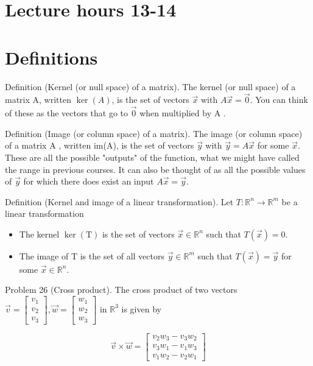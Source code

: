 \documentclass[10pt]{article}
\begin{document}
\section*{Lecture hours 13-14}
\section*{Definitions}
Definition (Kernel (or null space) of a matrix). The kernel (or null space) of a matrix A, written $\operatorname{ker}(A)$, is the set of vectors $\vec{x}$ with $A \vec{x}=\overrightarrow{0}$. You can think of these as the vectors that go to $\overrightarrow{0}$ when multiplied by A .

Definition (Image (or column space) of a matrix). The image (or column space) of a matrix A , written im(A), is the set of vectors $\vec{y}$ with $\vec{y}=A \vec{x}$ for some $\vec{x}$. These are all the possible "outputs" of the function, what we might have called the range in previous courses. It can also be thought of as all the possible values of $\vec{y}$ for which there does exist an input $A \vec{x}=\vec{y}$.

Definition (Kernel and image of a linear transformation). Let $T: \mathbb{R}^{n} \rightarrow \mathbb{R}^{m}$ be a linear transformation

\begin{itemize}
  \item The kernel $\operatorname{ker}(\mathrm{T})$ is the set of vectors $\vec{x} \in \mathbb{R}^{n}$ such that $T(\vec{x})=0$.
  \item The image of T is the set of all vectors $\vec{y} \in \mathbb{R}^{m}$ such that $T(\vec{x})=\vec{y}$ for some $\vec{x} \in \mathbb{R}^{n}$.
\end{itemize}

Problem 26 (Cross product). The cross product of two vectors $\vec{v}=\left[\begin{array}{l}v_{1} \\ v_{2} \\ v_{3}\end{array}\right], \vec{w}=\left[\begin{array}{l}w_{1} \\ w_{2} \\ w_{3}\end{array}\right]$ in $\mathbb{R}^{3}$ is given by

$$
\vec{v} \times \vec{w}=\left[\begin{array}{l}
v_{2} w_{3}-v_{3} w_{2} \\
v_{3} w_{1}-v_{1} w_{3} \\
v_{1} w_{2}-v_{2} w_{1}
\end{array}\right]
$$
\end{document}
